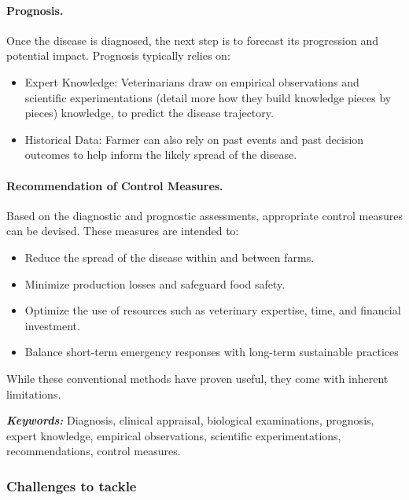 \paragraph{Prognosis.} Once the disease is diagnosed, the next step is to forecast its progression and potential impact. Prognosis typically relies on:
\begin{itemize}
    \item Expert Knowledge: Veterinarians draw on empirical observations and scientific experimentations (detail more how they build knowledge pieces by pieces) knowledge, to predict the disease trajectory.
    \item Historical Data: Farmer can also rely on past events and past decision outcomes to help inform the likely spread of the disease. 
\end{itemize}

\paragraph{Recommendation of Control Measures.} Based on the diagnostic and prognostic assessments, appropriate control measures can be devised. These measures are intended to:
\begin{itemize}
    \item Reduce the spread of the disease within and between farms.
    \item Minimize production losses and safeguard food safety.
    \item Optimize the use of resources such as veterinary expertise, time, and financial investment.
    \item Balance short-term emergency responses with long-term sustainable practices
\end{itemize}

While these conventional methods have proven useful, they come with inherent limitations.

\textit{\textbf{Keywords:}} Diagnosis, clinical appraisal, biological examinations, prognosis, expert knowledge, empirical observations, scientific experimentations, recommendations, control measures.


\subsubsection{Challenges to tackle}

